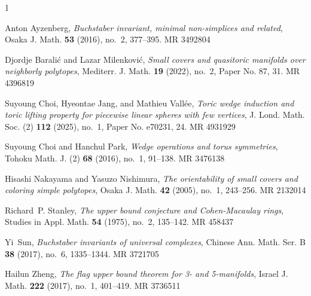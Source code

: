 \documentclass{amsart}
\theoremstyle{definition}
\theoremstyle{remark}
\begin{document}
\providecommand{\bysame}{\leavevmode\hbox to3em{\hrulefill}\thinspace}
\providecommand{\MR}{\relax\ifhmode\unskip\space\fi MR }
\providecommand{\MRhref}[2]{%
  \href{http://www.ams.org/mathscinet-getitem?mr=#1}{#2}
}
\providecommand{\href}[2]{#2}
\begin{thebibliography}{1}

Anton Ayzenberg, \emph{Buchstaber invariant, minimal non-simplices and
  related}, Osaka J. Math. \textbf{53} (2016), no.~2, 377--395. \MR{3492804}

Djordje Barali\'{c} and Lazar Milenkovi\'{c}, \emph{Small covers and quasitoric
  manifolds over neighborly polytopes}, Mediterr. J. Math. \textbf{19} (2022),
  no.~2, Paper No. 87, 31. \MR{4396819}

Suyoung Choi, Hyeontae Jang, and Mathieu Vall\'ee, \emph{Toric wedge induction
  and toric lifting property for piecewise linear spheres with few vertices},
  J. Lond. Math. Soc. (2) \textbf{112} (2025), no.~1, Paper No. e70231, 24.
  \MR{4931929}
  
Suyoung Choi and Hanchul Park, \emph{Wedge operations and torus symmetries}, Tohoku Math. J. (2) \textbf{68} (2016), no.~1, 91--138. \MR{3476138}

Hisashi Nakayama and Yasuzo Nishimura, \emph{The orientability of small covers
  and coloring simple polytopes}, Osaka J. Math. \textbf{42} (2005), no.~1,
  243--256. \MR{2132014}

Richard~P. Stanley, \emph{The upper bound conjecture and {C}ohen-{M}acaulay
  rings}, Studies in Appl. Math. \textbf{54} (1975), no.~2, 135--142.
  \MR{458437}

Yi~Sun, \emph{Buchstaber invariants of universal complexes}, Chinese Ann. Math.
  Ser. B \textbf{38} (2017), no.~6, 1335--1344. \MR{3721705}

Hailun Zheng, \emph{The flag upper bound theorem for 3- and 5-manifolds},
  Israel J. Math. \textbf{222} (2017), no.~1, 401--419. \MR{3736511}

\end{thebibliography}
\end{document}
